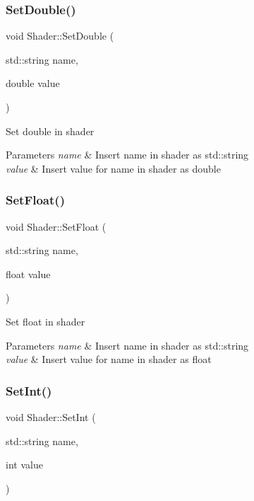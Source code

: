 \subsubsection{\texorpdfstring{SetDouble()}{SetDouble()}}
{\footnotesize\ttfamily void Shader\+::\+Set\+Double (\begin{DoxyParamCaption}\item[{std\+::string}]{name,  }\item[{double}]{value }\end{DoxyParamCaption})}

Set double in shader 
\begin{DoxyParams}{Parameters}
{\em name} & Insert name in shader as std\+::string \\
\hline
{\em value} & Insert value for \textquotesingle{}name\textquotesingle{} in shader as double \\
\hline
\end{DoxyParams}
\mbox{\label{class_shader_adf47ae73e99fb8d8c46facf3eec495d2}} 
\subsubsection{\texorpdfstring{SetFloat()}{SetFloat()}}
{\footnotesize\ttfamily void Shader\+::\+Set\+Float (\begin{DoxyParamCaption}\item[{std\+::string}]{name,  }\item[{float}]{value }\end{DoxyParamCaption})}

Set float in shader 
\begin{DoxyParams}{Parameters}
{\em name} & Insert name in shader as std\+::string \\
\hline
{\em value} & Insert value for \textquotesingle{}name\textquotesingle{} in shader as float \\
\hline
\end{DoxyParams}
\mbox{\label{class_shader_a5771e447d15d0f338ebbd03054c2f4d5}} 
\subsubsection{\texorpdfstring{SetInt()}{SetInt()}}
{\footnotesize\ttfamily void Shader\+::\+Set\+Int (\begin{DoxyParamCaption}\item[{std\+::string}]{name,  }\item[{int}]{value }\end{DoxyParamCaption})}


